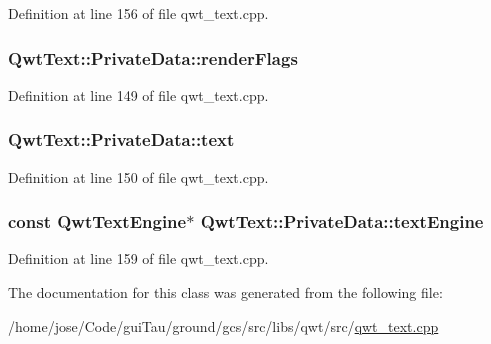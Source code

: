 Definition at line 156 of file qwt\-\_\-text.\-cpp.

\hypertarget{class_qwt_text_1_1_private_data_a85eca1b1929c48574ebfcbcfb20a5a26}{
\subsubsection[{render\-Flags}]{ Qwt\-Text\-::\-Private\-Data\-::render\-Flags}}\label{class_qwt_text_1_1_private_data_a85eca1b1929c48574ebfcbcfb20a5a26}


Definition at line 149 of file qwt\-\_\-text.\-cpp.

\hypertarget{class_qwt_text_1_1_private_data_a5d9f09e7ab55357d25c3361503b1ab5e}{
\subsubsection[{text}]{ Qwt\-Text\-::\-Private\-Data\-::text}}\label{class_qwt_text_1_1_private_data_a5d9f09e7ab55357d25c3361503b1ab5e}


Definition at line 150 of file qwt\-\_\-text.\-cpp.

\hypertarget{class_qwt_text_1_1_private_data_a035f422e182dfab31278b23b019fe11f}{
\subsubsection[{text\-Engine}]{\setlength{\rightskip}{0pt plus 5cm}const {\bf Qwt\-Text\-Engine}$\ast$ Qwt\-Text\-::\-Private\-Data\-::text\-Engine}}\label{class_qwt_text_1_1_private_data_a035f422e182dfab31278b23b019fe11f}


Definition at line 159 of file qwt\-\_\-text.\-cpp.



The documentation for this class was generated from the following file\-:\begin{DoxyCompactItemize}
\item 
/home/jose/\-Code/gui\-Tau/ground/gcs/src/libs/qwt/src/\hyperlink{qwt__text_8cpp}{qwt\-\_\-text.\-cpp}\end{DoxyCompactItemize}
